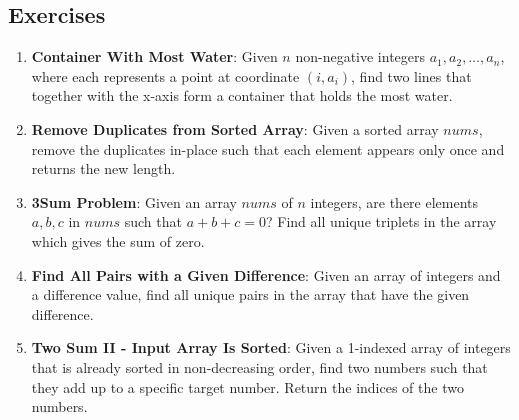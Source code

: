 \subsection*{Exercises}
\begin{enumerate}
    \item \textbf{Container With Most Water}: Given \(n\) non-negative integers \(a_1, a_2, \ldots, a_n\), where each represents a point at coordinate \((i, a_i)\), find two lines that together with the x-axis form a container that holds the most water.
    
    \item \textbf{Remove Duplicates from Sorted Array}: Given a sorted array \(nums\), remove the duplicates in-place such that each element appears only once and returns the new length.
    
    \item \textbf{3Sum Problem}: Given an array \(nums\) of \(n\) integers, are there elements \(a, b, c\) in \(nums\) such that \(a + b + c = 0\)? Find all unique triplets in the array which gives the sum of zero.
    
    \item \textbf{Find All Pairs with a Given Difference}: Given an array of integers and a difference value, find all unique pairs in the array that have the given difference.
    
    \item \textbf{Two Sum II - Input Array Is Sorted}: Given a 1-indexed array of integers that is already sorted in non-decreasing order, find two numbers such that they add up to a specific target number. Return the indices of the two numbers.
\end{enumerate}


